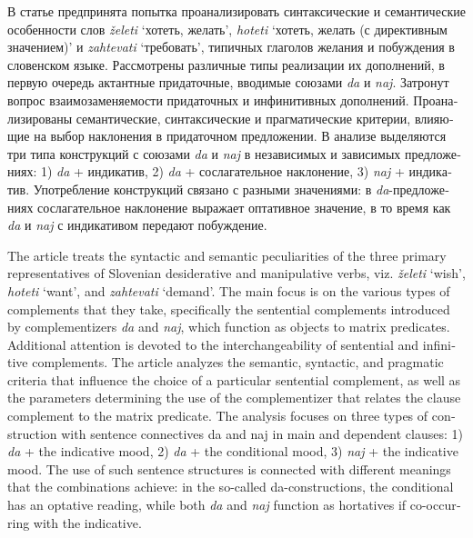 \begin{otherlanguage}{russian}
В статье предпринята попытка проанализировать синтаксические и семантические особенности слов \textit{želeti} ‘хотеть, желать’, \textit{hoteti} ‘хотеть, желать (с директивным значением)’ и \textit{zahtevati} ‘требовать’, типичных глаголов желания и побуждения в словенском языке. Рассмотрены различные типы реализации их дополнений, в первую очередь актантные придаточные, вводимые союзами \textit{da} и \textit{naj}. Затронут вопрос взаимозаменяемости придаточных и инфинитивных дополнений. Проанализированы семантические, синтаксические и прагматические критерии, влияющие на выбор наклонения в придаточном предложении. В анализе выделяются три типа конструкций с союзами \textit{da} и \textit{naj} в независимых и зависимых предложениях: 1) \textit{da} + индикатив, 2) \textit{da} + сослагательное наклонение, 3) \textit{naj} + индикатив. Употребление конструкций связано с разными значениями: в \textit{da}-предложениях сослагательное наклонение выражает оптативное значение, в то время как \textit{da} и \textit{naj} с индикативом передают побуждение.
\end{otherlanguage}

\begin{otherlanguage}{english}
The article treats the syntactic and semantic peculiarities of the three primary representatives of Slovenian desiderative and manipulative verbs, viz. \textit{želeti} ‘wish’, \textit{hoteti} ‘want’, and \textit{zahtevati} ‘demand’. The main focus is on the various types of complements that they take, specifically the sentential complements introduced by complementizers \textit{da} and \textit{naj}, which function as objects to matrix predicates. Additional attention is devoted to the interchangeability of sentential and infinitive complements. The article analyzes the semantic, syntactic, and pragmatic criteria that influence the choice of a particular sentential complement, as well as the parameters determining the use of the complementizer that relates the clause complement to the matrix predicate. The analysis focuses on three types of construction with sentence connectives da and naj in main and dependent clauses: 1) \textit{da} + the indicative mood, 2) \textit{da} + the conditional mood, 3) \textit{naj} + the indicative mood. The use of such sentence structures is connected with different meanings that the combinations achieve: in the so-called da-constructions, the conditional has an optative reading, while both \textit{da} and \textit{naj} function as hortatives if co-occurring with the indicative.
\end{otherlanguage}
\endinput
